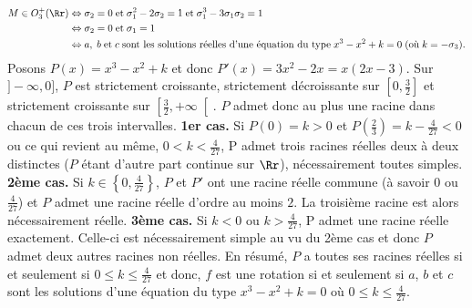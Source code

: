 {{\begin{align*}\ensuremath
M\in O_3^+(\Rr)&\Leftrightarrow\sigma_2=0\;\mbox{et}\;\sigma_1^2-2\sigma_2=1\;\mbox{et}\;\sigma_1^3-3\sigma_1\sigma_2=1\\
 &\Leftrightarrow\sigma_2=0\;\text{et}\;\sigma_1=1\\
 &\Leftrightarrow a,\;b\;\mbox{et}\;c\;\mbox{sont les solutions réelles d'une équation du type}\;x^3-x^2+k=0\;(\mbox{où}\;k=-\sigma_3).
\end{align*}
Posons $P(x)=x^3-x^2+k$ et donc $P'(x)=3x^2-2x=x(2x-3)$.
Sur $]-\infty,0]$, $P$ est strictement croissante, strictement décroissante sur $\left[0,\frac{3}{2}\right]$ et strictement croissante sur $\left[\frac{3}{2},+\infty\right[$. $P$ admet donc au plus une racine dans chacun de ces trois intervalles.
\textbf{1er cas.} Si $P(0)=k>0$ et $P\left(\frac{2}{3}\right)=k-\frac{4}{27}<0$ ou ce qui revient au même, $0<k<\frac{4}{27}$, P admet trois racines réelles deux à deux distinctes ($P$ étant d'autre part continue sur $\Rr$), nécessairement toutes simples.
\textbf{2ème cas.} Si $k\in\left\{0,\frac{4}{27}\right\}$, $P$ et $P'$ ont une racine réelle commune (à savoir $0$ ou $\frac{4}{27}$) et $P$ admet une racine réelle d'ordre au moins $2$. La troisième racine est alors nécessairement réelle.
\textbf{3ème cas.} Si $k<0$ ou $k>\frac{4}{27}$, P admet une racine réelle exactement. Celle-ci est nécessairement simple au vu du 2ème cas et donc $P$ admet deux autres racines non réelles.
En résumé, $P$ a toutes ses racines réelles si et seulement si $0\leq k\leq\frac{4}{27}$ et donc, $f$ est une rotation si et seulement si $a$, $b$ et $c$ sont les solutions d'une équation du type $x^3-x^2+k=0$ où $0\leq k\leq\frac{4}{27}$.
}
}
